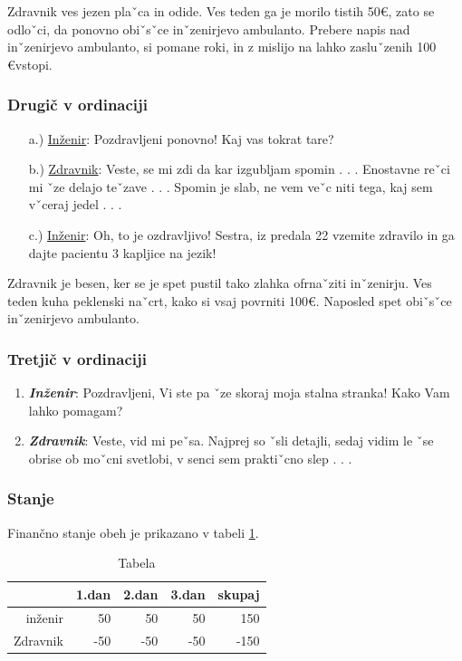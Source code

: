 \documentclass[12pt, a4paper]{article}
\begin{document}
Zdravnik ves jezen plaˇca in odide. Ves teden ga je morilo tistih 50\euro, zato se odloˇci, da ponovno obiˇsˇce inˇzenirjevo ambulanto. Prebere napis nad inˇzenirjevo ambulanto, si pomane roki, in z mislijo na lahko zasluˇzenih 100 \euro vstopi.

\subsubsection{Drugič v ordinaciji}

\begin{enumerate}
\item[a.)] \underline{Inženir}: Pozdravljeni ponovno! Kaj vas tokrat tare?
\item[b.)] \underline{Zdravnik}: Veste, se mi zdi da kar izgubljam spomin . . . Enostavne reˇci mi ˇze delajo teˇzave . . . Spomin je slab, ne vem veˇc niti tega, kaj sem vˇceraj jedel . . .
\item[c.)] \underline{Inženir}: Oh, to je ozdravljivo! Sestra, iz predala 22 vzemite zdravilo in ga dajte pacientu 3 kapljice na jezik!
\end{enumerate}

Zdravnik je besen, ker se je spet pustil tako zlahka ofrnaˇziti inˇzenirju.
Ves teden kuha peklenski naˇcrt, kako si vsaj povrniti 100€. Naposled spet obiˇsˇce inˇzenirjevo ambulanto.

\subsubsection{Tretjič v ordinaciji}

\begin{enumerate}[i]
\item \textit{\textbf{Inženir}}: Pozdravljeni, Vi ste pa ˇze skoraj moja stalna stranka! Kako Vam lahko pomagam?
\item \textit{\textbf{Zdravnik}}: Veste, vid mi peˇsa. Najprej so ˇsli detajli, sedaj vidim le ˇse obrise ob moˇcni svetlobi, v senci sem praktiˇcno slep . . .

\end{enumerate}

\subsubsection{Stanje}

Finančno stanje obeh je prikazano v tabeli \ref{tab:tabela}.

\begin{table}[h!]
\centering
\begin{tabular}{r | r | r | r | r}
 & 1.dan & 2.dan & 3.dan & \textbf{skupaj} \\ \hline
 inženir & 50 & 50 & 50 & 150 \\ 
 Zdravnik & -50 & -50 & -50 & -150 \\ 
\end{tabular}
\caption{Tabela}
\label{tab:tabela}
\end{table}
\end{document}
